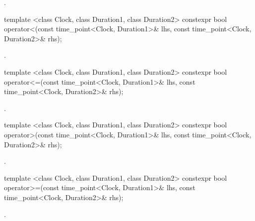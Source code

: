 \begin{itemdescr}
\pnum
\returns {}.
\end{itemdescr}

%
%
\begin{itemdecl}
template <class Clock, class Duration1, class Duration2>
  constexpr bool operator<(const time_point<Clock, Duration1>& lhs, const time_point<Clock, Duration2>& rhs);
\end{itemdecl}

\begin{itemdescr}
\pnum
\returns {}.
\end{itemdescr}

%
%
\begin{itemdecl}
template <class Clock, class Duration1, class Duration2>
  constexpr bool operator<=(const time_point<Clock, Duration1>& lhs, const time_point<Clock, Duration2>& rhs);
\end{itemdecl}

\begin{itemdescr}
\pnum
\returns {}.
\end{itemdescr}

%
%
\begin{itemdecl}
template <class Clock, class Duration1, class Duration2>
  constexpr bool operator>(const time_point<Clock, Duration1>& lhs, const time_point<Clock, Duration2>& rhs);
\end{itemdecl}

\begin{itemdescr}
\pnum
\returns {}.
\end{itemdescr}

%
%
\begin{itemdecl}
template <class Clock, class Duration1, class Duration2>
  constexpr bool operator>=(const time_point<Clock, Duration1>& lhs, const time_point<Clock, Duration2>& rhs);
\end{itemdecl}

\begin{itemdescr}
\pnum
\returns {}.
\end{itemdescr}

